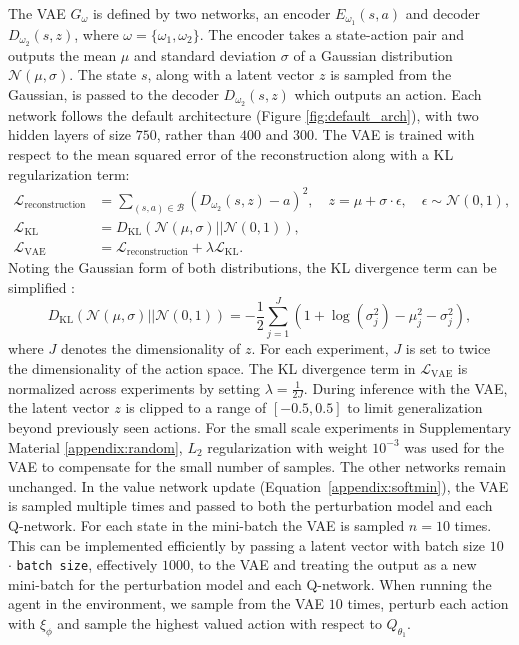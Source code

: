 \documentclass{article}
\newcommand{\e}{\epsilon}
\newcommand{\ta}{\theta}
\newcommand{\w}{\omega}
\newcommand{\N}{\mathcal{N}}
\newcommand{\B}{\mathcal{B}}
\begin{document}
The VAE $G_\w$ is defined by two networks, an encoder $E_{\w_1}(s,a)$ and decoder $D_{\w_2}(s, z)$, where $\w = \{\w_1, \w_2\}$. The encoder takes a state-action pair and outputs the mean $\mu$ and standard deviation $\sigma$ of a Gaussian distribution $\N(\mu, \sigma)$. The state $s$, along with a latent vector $z$ is sampled from the Gaussian, is passed to the decoder $D_{\w_2}(s, z)$ which outputs an action. Each network follows the default architecture (Figure \ref{fig:default_arch}), with two hidden layers of size $750$, rather than $400$ and $300$. The VAE is trained with respect to the mean squared error of the reconstruction along with a KL regularization term:
\begin{align}
\mathcal{L}_{\text{reconstruction}} &= \sum_{(s,a) \in \B} (D_{\w_2}(s,z) - a)^2, \quad z = \mu + \sigma \cdot \e, \quad \e \sim \N(0,1), \\
\mathcal{L}_{\text{KL}} &= D_{\text{KL}}(\N(\mu, \sigma)||\N(0,1)), \\
\mathcal{L}_{\text{VAE}} &= \mathcal{L}_{\text{reconstruction}} + \lambda \mathcal{L}_{\text{KL}}.
\end{align}
Noting the Gaussian form of both distributions, the KL divergence term can be simplified \citep{kingma2013auto}:
\begin{equation}
D_{\text{KL}}(\N(\mu, \sigma)||\N(0,1)) = - \frac{1}{2} \sum_{j=1}^J (1 +\log(\sigma_j^2) - \mu_j^2 - \sigma_j^2),
\end{equation}
where $J$ denotes the dimensionality of $z$. For each experiment, $J$ is set to twice the dimensionality of the action space. The KL divergence term in  $\mathcal{L}_{\text{VAE}}$ is normalized across experiments by setting $\lambda = \frac{1}{2J}$. During inference with the VAE, the latent vector $z$ is clipped to a range of $[-0.5, 0.5]$ to limit generalization beyond previously seen actions. 
For the small scale experiments in Supplementary Material \ref{appendix:random}, $L_2$ regularization with weight $10^{-3}$ was used for the VAE to compensate for the small number of samples. The other networks remain unchanged. 
In the value network update (Equation~\ref{appendix:softmin}), the VAE is sampled multiple times and passed to both the perturbation model and each Q-network. For each state in the mini-batch the VAE is sampled $n=10$ times. This can be implemented efficiently by passing a latent vector with batch size $10$ $\cdot$ \texttt{batch size}, effectively $1000$, to the VAE and treating the output as a new mini-batch for the perturbation model and each Q-network. When running the agent in the environment, we sample from the VAE $10$ times, perturb each action with $\xi_\phi$ and sample the highest valued action with respect to $Q_{\ta_1}$. 
\end{document}
